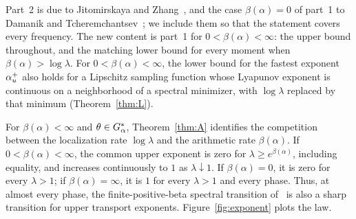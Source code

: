 Part~2 is due to Jitomirskaya and Zhang~\cite[Corollary~3]{JZ2022}, and the case $\beta(\alpha)=0$ of part~1 to Damanik and Tcheremchantsev~\cite{DT2007}; we include them so that the statement covers every frequency. The new content is part~1 for $0<\beta(\alpha)<\infty$: the upper bound throughout, and the matching lower bound for every moment when $\beta(\alpha)>\log\lambda$. For $0<\beta(\alpha)<\infty$, the lower bound for the fastest exponent $\alpha_u^+$ also holds for a Lipschitz sampling function whose Lyapunov exponent is continuous on a neighborhood of a spectral minimizer, with $\log\lambda$ replaced by that minimum (Theorem~\ref{thm:L}).

For $\beta(\alpha)<\infty$ and $\theta\in G_\alpha^*$, Theorem~\ref{thm:A} identifies the competition between the localization rate $\log\lambda$ and the arithmetic rate $\beta(\alpha)$. If $0<\beta(\alpha)<\infty$, the common upper exponent is zero for $\lambda\ge e^{\beta(\alpha)}$, including equality, and increases continuously to $1$ as $\lambda\downarrow1$. If $\beta(\alpha)=0$, it is zero for every $\lambda>1$; if $\beta(\alpha)=\infty$, it is $1$ for every $\lambda>1$ and every phase. Thus, at almost every phase, the finite-positive-beta spectral transition of~\cite{AYZ2017} is also a sharp transition for upper transport exponents. Figure~\ref{fig:exponent} plots the law.

